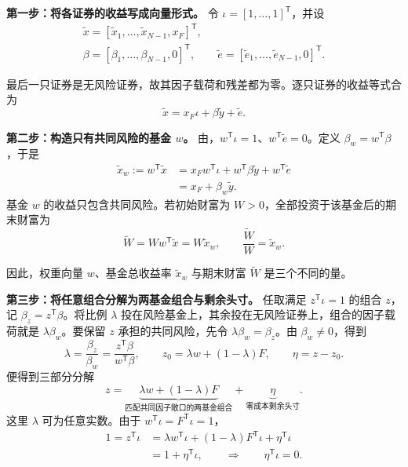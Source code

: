 \begin{solution}[label-content={证明},blank-type=none]
\textbf{第一步：将各证券的收益写成向量形式。}
令 $\iota=[1,\ldots,1]^{\mathsf T}$，并设
\[
\begin{gathered}
 \tilde x=[\tilde x_1,\ldots,\tilde x_{N-1},x_F]^{\mathsf T},\\
 \beta=[\beta_1,\ldots,\beta_{N-1},0]^{\mathsf T},\qquad
 \tilde e=[\tilde e_1,\ldots,\tilde e_{N-1},0]^{\mathsf T}.
\end{gathered}
\]

最后一只证券是无风险证券，故其因子载荷和残差都为零。逐只证券的收益等式合为
\[
 \boxed{\tilde x=x_F\iota+\beta\tilde y+\tilde e.}
\]

\textbf{第二步：构造只有共同风险的基金 $w$。}
由，$w^{\mathsf T}\iota=1$、$w^{\mathsf T}\tilde e=0$。定义 $\beta_w=w^{\mathsf T}\beta$，于是
\[
\begin{aligned}
 \tilde x_w:=w^{\mathsf T}\tilde x
 &=x_Fw^{\mathsf T}\iota+w^{\mathsf T}\beta\tilde y
   +w^{\mathsf T}\tilde e\\
 &=x_F+\beta_w\tilde y.
\end{aligned}
\]
基金 $w$ 的收益只包含共同风险。若初始财富为 $W>0$，全部投资于该基金后的期末财富为
\[
 \tilde W=Ww^{\mathsf T}\tilde x=W\tilde x_w,
 \qquad \frac{\tilde W}{W}=\tilde x_w.
\]

因此，权重向量 $w$、基金总收益率 $\tilde x_w$ 与期末财富 $\tilde W$ 是三个不同的量。

\textbf{第三步：将任意组合分解为两基金组合与剩余头寸。}
任取满足 $z^{\mathsf T}\iota=1$ 的组合 $z$，记 $\beta_z=z^{\mathsf T}\beta$。将比例 $\lambda$ 投在风险基金上，其余投在无风险证券上，组合的因子载荷就是 $\lambda\beta_w$。要保留 $z$ 承担的共同风险，先令 $\lambda\beta_w=\beta_z$。由 $\beta_w\ne0$，得到
\[
 \lambda=\frac{\beta_z}{\beta_w}
 =\frac{z^{\mathsf T}\beta}{w^{\mathsf T}\beta},\qquad
 z_0=\lambda w+(1-\lambda)F,\qquad \eta=z-z_0.
\]
便得到三部分分解
\[
 z=\underbrace{\lambda w+(1-\lambda)F}_{\text{匹配共同因子敞口的两基金组合}}
  +\underbrace{\eta}_{\text{零成本剩余头寸}}.
\]
这里 $\lambda$ 可为任意实数。由于 $w^{\mathsf T}\iota=F^{\mathsf T}\iota=1$，
\[
\begin{aligned}
 1=z^{\mathsf T}\iota
 &=\lambda w^{\mathsf T}\iota+(1-\lambda)F^{\mathsf T}\iota
   +\eta^{\mathsf T}\iota\\
 &=1+\eta^{\mathsf T}\iota,
 \qquad\Longrightarrow\qquad \eta^{\mathsf T}\iota=0.
\end{aligned}
\]


\end{solution}
